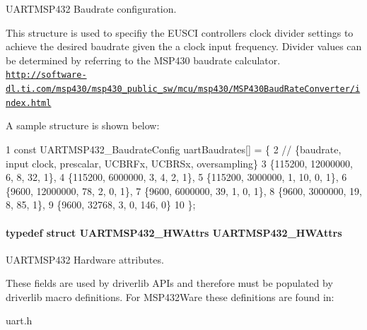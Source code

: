 U\+A\+R\+T\+M\+S\+P432 Baudrate configuration. 

This structure is used to specifiy the E\+U\+S\+C\+I controller\textquotesingle{}s clock divider settings to achieve the desired baudrate given the a clock input frequency. Divider values can be determined by referring to the M\+S\+P430 baudrate calculator. \href{http://software-dl.ti.com/msp430/msp430_public_sw/mcu/msp430/MSP430BaudRateConverter/index.html}{\tt http\+://software-\/dl.\+ti.\+com/msp430/msp430\+\_\+public\+\_\+sw/mcu/msp430/\+M\+S\+P430\+Baud\+Rate\+Converter/index.\+html}

A sample structure is shown below\+: 
\begin{DoxyCode}
1 const UARTMSP432\_BaudrateConfig uartBaudrates[] = \{
2     // \{baudrate, input clock, prescalar, UCBRFx, UCBRSx, oversampling\}
3     \{115200, 12000000,  6,  8,  32, 1\},
4     \{115200, 6000000,   3,  4,   2, 1\},
5     \{115200, 3000000,   1, 10,   0, 1\},
6     \{9600,   12000000, 78,  2,   0, 1\},
7     \{9600,   6000000,  39,  1,   0, 1\},
8     \{9600,   3000000,  19,  8,  85, 1\},
9     \{9600,   32768,     3,  0, 146, 0\}
10 \};
\end{DoxyCode}
\paragraph[{U\+A\+R\+T\+M\+S\+P432\+\_\+\+H\+W\+Attrs}]{\setlength{\rightskip}{0pt plus 5cm}typedef struct {\bf U\+A\+R\+T\+M\+S\+P432\+\_\+\+H\+W\+Attrs}  {\bf U\+A\+R\+T\+M\+S\+P432\+\_\+\+H\+W\+Attrs}}\label{_u_a_r_t_m_s_p432_8h_aa0eb8afac37f3295fff965a57465d353}


U\+A\+R\+T\+M\+S\+P432 Hardware attributes. 

These fields are used by driverlib A\+P\+Is and therefore must be populated by driverlib macro definitions. For M\+S\+P432\+Ware these definitions are found in\+:
\begin{DoxyItemize}
\item uart.\+h
\end{DoxyItemize}


